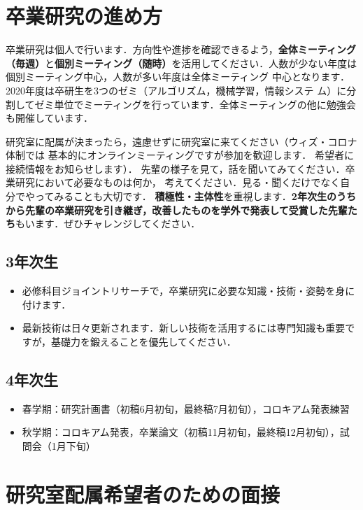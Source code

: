 \documentclass[uplatex,jis2004,a4paper,11pt]{jsarticle}
\renewcommand{\emph}[1]{\textbf{#1}}
\begin{document}
\clearpage
\section{卒業研究の進め方}

卒業研究は個人で行います．方向性や進捗を確認できるよう，\emph{全体ミーティング（毎週）}と\emph{個別ミーティング（随時）}を活用してください．人数が少ない年度は個別ミーティング中心，人数が多い年度は全体ミーティング
中心となります．2020年度は卒研生を3つのゼミ（アルゴリズム，機械学習，情報システ
ム）に分割してゼミ単位でミーティングを行っています．全体ミーティングの他に勉強会
も開催しています．

研究室に配属が決まったら，遠慮せずに研究室に来てください（ウィズ・コロナ体制では
基本的にオンラインミーティングですが参加を歓迎します．
希望者に接続情報をお知らせします）．
先輩の様子を見て，話を聞いてみてください．卒業研究において必要なものは何か，
考えてください．見る・聞くだけでなく自分でやってみることも大切です．
\emph{積極性・主体性}を重視します．\emph{2年次生のうちから先輩の卒業研究を引き継ぎ，改善したものを学外で発表して受賞した先輩たち}もいます．ぜひチャレンジしてください．
\vspace{-.3cm}
\subsection*{3年次生}
\vspace{-.3cm}
\begin{itemize}
  \item 必修科目ジョイントリサーチで，卒業研究に必要な知識・技術・姿勢を身に付けます．
  \item 最新技術は日々更新されます．新しい技術を活用するには専門知識も重要ですが，基礎力を鍛えることを優先してください．
\end{itemize}
\vspace{-.6cm}
\subsection*{4年次生}
\vspace{-.3cm}
\begin{itemize}
  \item 春学期：研究計画書（初稿6月初旬，最終稿7月初旬），コロキアム発表練習
  \item 秋学期：コロキアム発表，卒業論文（初稿11月初旬，最終稿12月初旬），試問会（1月下旬）
\end{itemize}

\section{研究室配属希望者のための面接}
\end{document}
